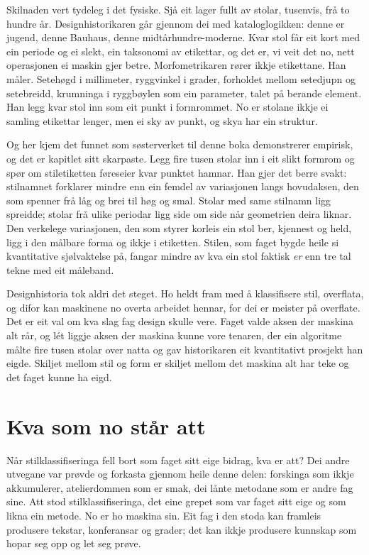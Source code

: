 Skilnaden vert tydeleg i det fysiske. Sjå eit lager fullt av stolar, tusenvis, frå to hundre år. Designhistorikaren går gjennom dei med kataloglogikken: denne er jugend, denne Bauhaus, denne midtårhundre-moderne. Kvar stol får eit kort med ein periode og ei slekt, ein taksonomi av etikettar, og det er, vi veit det no, nett operasjonen ei maskin gjer betre. Morfometrikaren rører ikkje etikettane. Han måler. Setehøgd i millimeter, ryggvinkel i grader, forholdet mellom setedjupn og setebreidd, krumninga i ryggbøylen som ein parameter, talet på berande element. Han legg kvar stol inn som eit punkt i formrommet. No er stolane ikkje ei samling etikettar lenger, men ei sky av punkt, og skya har ein struktur.

Og her kjem det funnet som søsterverket til denne boka demonstrerer empirisk, og det er kapitlet sitt skarpaste. Legg fire tusen stolar inn i eit slikt formrom og spør om stiletiketten føreseier kvar punktet hamnar. Han gjer det berre svakt: stilnamnet forklarer mindre enn ein femdel av variasjonen langs hovudaksen, den som spenner frå låg og brei til høg og smal. Stolar med same stilnamn ligg spreidde; stolar frå ulike periodar ligg side om side når geometrien deira liknar. Den verkelege variasjonen, den som styrer korleis ein stol ber, kjennest og held, ligg i den målbare forma og ikkje i etiketten. Stilen, som faget bygde heile si kvantitative sjølvaktelse på, fangar mindre av kva ein stol faktisk \emph{er} enn tre tal tekne med eit måleband.

Designhistoria tok aldri det steget. Ho heldt fram med å klassifisere stil, overflata, og difor kan maskinene no overta arbeidet hennar, for dei er meister på overflate. Det er eit val om kva slag fag design skulle vere. Faget valde aksen der maskina alt rår, og lét liggje aksen der maskina kunne vore tenaren, der ein algoritme målte fire tusen stolar over natta og gav historikaren eit kvantitativt prosjekt han eigde. Skiljet mellom stil og form er skiljet mellom det maskina alt har teke og det faget kunne ha eigd.

\section{Kva som no står att}

Når stilklassifiseringa fell bort som faget sitt eige bidrag, kva er att? Dei andre utvegane var prøvde og forkasta gjennom heile denne delen: forskinga som ikkje akkumulerer, atelierdommen som er smak, dei lånte metodane som er andre fag sine. Att stod stilklassifiseringa, det eine grepet som var faget sitt eige og som likna ein metode. No er ho maskina sin. Eit fag i den stoda kan framleis produsere tekstar, konferansar og grader; det kan ikkje produsere kunnskap som hopar seg opp og let seg prøve.

